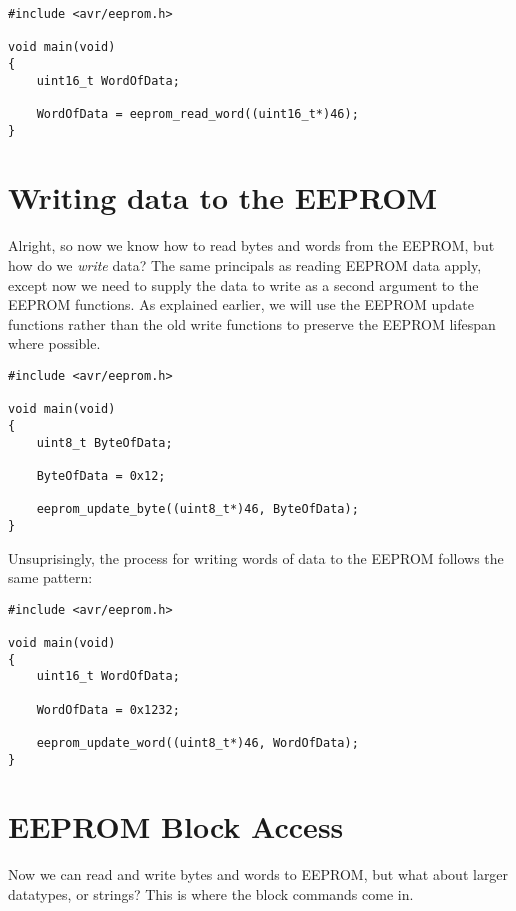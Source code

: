\documentclass[a4paper,oneside,notitlepage]{book}
\begin{document}
\begin{center}
\begin{lstlisting}
#include <avr/eeprom.h>

void main(void)
{
    uint16_t WordOfData;

    WordOfData = eeprom_read_word((uint16_t*)46);
}
\end{lstlisting}
\end{center}


\chapter{Writing data to the EEPROM}

Alright, so now we know how to read bytes and words from the EEPROM, but how do we \textit{write} data? The same principals as reading EEPROM data apply, except now we need to supply the data to write as a second argument to the EEPROM functions. As explained earlier, we will use the EEPROM update functions rather than the old write functions to preserve the EEPROM lifespan where possible.

\begin{center}
\begin{lstlisting}
#include <avr/eeprom.h>

void main(void)
{
    uint8_t ByteOfData;
	
    ByteOfData = 0x12;

    eeprom_update_byte((uint8_t*)46, ByteOfData);
}
\end{lstlisting}
\end{center}

Unsuprisingly, the process for writing words of data to the EEPROM follows the same pattern:

\begin{center}
\begin{lstlisting}
#include <avr/eeprom.h>

void main(void)
{
    uint16_t WordOfData;
	
    WordOfData = 0x1232;

    eeprom_update_word((uint8_t*)46, WordOfData);
}
\end{lstlisting}
\end{center}


\chapter{EEPROM Block Access}

Now we can read and write bytes and words to EEPROM, but what about larger datatypes, or strings? This is where the block commands come in.
\end{document}
